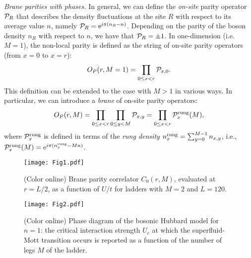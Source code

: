 \documentclass[aps,prb,floatfix,twocolumn,amsmath,amssymb]{revtex4}
\begin{document}
{\it Brane parities with phases.} In general, we can define the {\it on-site} parity operator ${\cal P}_R$ that describes the 
density fluctuations at the site $R$ with respect to its average value $n$, namely ${\cal P}_R= {\rm e}^{i \pi (n_R-n)}$. Depending 
on the parity of the boson density $n_R$ with respect to $n$, we have that ${\cal P}_R= \pm 1$. In one-dimension (i.e. $M=1$), 
the non-local parity is defined as the string of on-site parity operators (from $x=0$ to $x=r$):
\begin{equation}\label{eq:NLO1D}
O_P(r,M=1)=\prod_{0 \le x < r} {\cal P}_{x,0}.
\end{equation}
This definition can be extended to the case with $M>1$ in various ways. In particular, we can introduce a {\it brane} of on-site 
parity operators:
\begin{equation}\label{eq:NLO2D}
O_P(r,M)=\prod_{0 \le x < r} \prod_{0 \le y < M} {\cal P}_{x,y} =
\prod_{0 \le x < r} {\cal P}^{\rm rung}_{x}(M),
\end{equation}
where ${\cal P}_x^{\rm rung}$ is defined in terms of the {\it rung density} $n^{\rm rung}_x = \sum_{y=0}^{M-1} n_{x,y}$, i.e., 
${\cal P}^{\rm rung}_x(M)= {\rm e}^{i \pi (n^{\rm rung}_x-Mn)}$. 

\begin{figure}
\texttt{[image: Fig1.pdf]}
\caption{\label{fig:CPM2}
(Color online) Brane parity correlator $C_0(r,M)$, evaluated at $r=L/2$, as a function of $U/t$ for ladders with $M=2$ and $L=120$.}
\end{figure}

\begin{figure}
\texttt{[image: Fig2.pdf]}
\caption{\label{fig:phasediag}
(Color online) Phase diagram of the bosonic Hubbard model for $n=1$: the critical interaction strength $U_c$ at which the 
superfluid-Mott transition occurs is reported as a function of the number of legs $M$ of the ladder.}
\end{figure}
\end{document}
